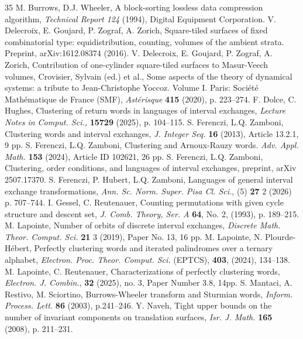 \documentclass[12pt,a4paper]{amsart}
\begin{document}
\begin{thebibliography}{35}
 M. Burrows, D.J. Wheeler,  A block-sorting lossless data compression algorithm, {\it Technical Report 124} (1994), Digital Equipment Corporation.
 V. Delecroix, E. Goujard, P. Zograf, A. Zorich, Square-tiled surfaces of fixed combinatorial type: equidistribution, counting, volumes of the ambient strata. 
Preprint, arXiv:1612.08374 (2016).
 V. Delecroix, E. Goujard, P. Zograf, A. Zorich, 
Contribution of one-cylinder square-tiled surfaces to Masur-Veech volumes, 
Crovisier, Sylvain (ed.) et al., Some aspects of the theory of dynamical systems: a tribute to Jean-Christophe Yoccoz. Volume I. Paris: Société Mathématique de France (SMF), {\it Astérisque} {\bf 415} (2020), p. 223--274.
 F. Dolce, C. Hughes, Clustering of return words in languages of  interval exchanges, {\it Lecture Notes in Comput. Sci.,} {\bf 15729} (2025), p. 104--115. 
 S. Ferenczi, L.Q. Zamboni,  Clustering words and interval exchanges, {\it J. Integer Seq.} {\bf 16} (2013), Article 13.2.1, 9 pp.
 S. Ferenczi, L.Q. Zamboni,
Clustering and Arnoux-Rauzy words. 
{\it Adv. Appl. Math.} {\bf 153} (2024), Article ID 102621, 26 pp. 
 S. Ferenczi, L.Q. Zamboni,
Clustering, order conditions, and languages of  interval exchanges, preprint, arXiv 2507.17370.
 S. Ferenczi, P. Hubert, L.Q. Zamboni,
Languages of  general interval exchange transformations, 
{\it Ann. Sc.  Norm. Super. Pisa Cl. Sci.},  (5)  {\bf 27} 2 (2026) p. 707--744.
 I. Gessel,  C. Reutenauer, Counting permutations with given cycle structure and descent set, 
{\it J. Comb. Theory, Ser. A} {\bf 64}, No. 2, (1993), p. 189--215.
 M. Lapointe,
Number of orbits of discrete interval exchanges,
{\it Discrete Math. Theor. Comput. Sci.} {\bf 21} 3 (2019), Paper No. 13, 16 pp.
 M. Lapointe, N. Plourde-Hébert, Perfectly clustering words and iterated palindromes over a ternary alphabet, {\it Electron. Proc. Theor. Comput. Sci.} (EPTCS), {\bf 403}, (2024), 134--138.
 M. Lapointe, C. Reutenauer, Characterizations of perfectly clustering words, {\it Electron. J. Combin.}, {\bf 32} (2025), no. 3, Paper Number 3.8, 14pp. 
 S. Mantaci, A. Restivo, M. Sciortino,   Burrows-Wheeler transform and Sturmian words, {\it Inform. Process. Lett.} {\bf 86} (2003), p.241--246. 
 Y. Naveh, Tight upper bounds on the number of invariant components on translation surfaces, 
{\it Isr. J. Math.}  {\bf 165} (2008), p.  211--231.

\end{thebibliography}
\end{document}
